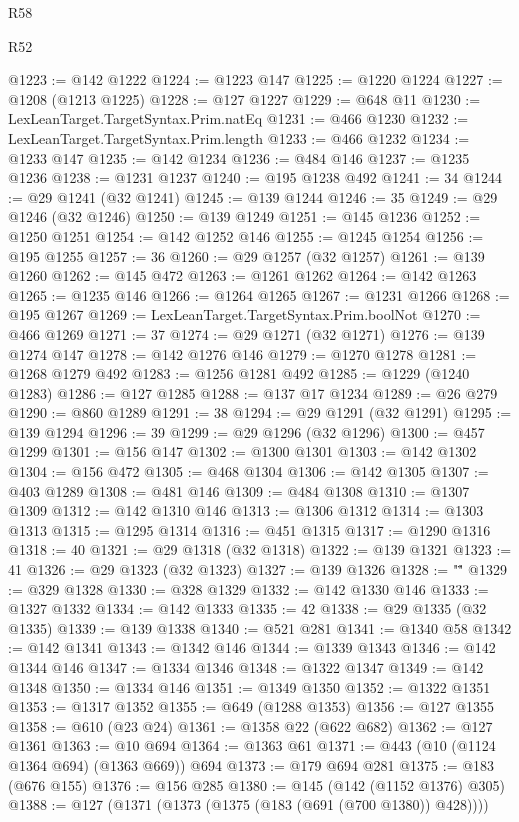 \begin{lexlean}{R58}
\begin{lexlean}{R52}
\begin{coremodule}
{{{{{{{{{{{{{{{{{{{{{{{{{{{{{{{{{{{{{{{{{{{{{{{{{{{{{{{{{{{{{{{{{{{{{{{{{{{{{{{{{{{{{{{{{{{{{{{{{{{{{{{{{{{{{{{{{{{{{{{{{{{{{{{{{{{{{{{{{{{{{{{{{{{{{{{{{{{{{{{{{{{{{{{{{{{{{{{{{{{{{{{{{{{{{{{{{{{{{{@1223 := @142 @1222
@1224 := @1223 @147
@1225 := @1220 @1224
@1227 := @1208 (@1213 @1225)
@1228 := @127 @1227
@1229 := @648 @11
@1230 := LexLeanTarget.TargetSyntax.Prim.natEq
@1231 := @466 @1230
@1232 := LexLeanTarget.TargetSyntax.Prim.length
@1233 := @466 @1232
@1234 := @1233 @147
@1235 := @142 @1234
@1236 := @484 @146
@1237 := @1235 @1236
@1238 := @1231 @1237
@1240 := @195 @1238 @492
@1241 := 34
@1244 := @29 @1241 (@32 @1241)
@1245 := @139 @1244
@1246 := 35
@1249 := @29 @1246 (@32 @1246)
@1250 := @139 @1249
@1251 := @145 @1236
@1252 := @1250 @1251
@1254 := @142 @1252 @146
@1255 := @1245 @1254
@1256 := @195 @1255
@1257 := 36
@1260 := @29 @1257 (@32 @1257)
@1261 := @139 @1260
@1262 := @145 @472
@1263 := @1261 @1262
@1264 := @142 @1263
@1265 := @1235 @146
@1266 := @1264 @1265
@1267 := @1231 @1266
@1268 := @195 @1267
@1269 := LexLeanTarget.TargetSyntax.Prim.boolNot
@1270 := @466 @1269
@1271 := 37
@1274 := @29 @1271 (@32 @1271)
@1276 := @139 @1274 @147
@1278 := @142 @1276 @146
@1279 := @1270 @1278
@1281 := @1268 @1279 @492
@1283 := @1256 @1281 @492
@1285 := @1229 (@1240 @1283)
@1286 := @127 @1285
@1288 := @137 @17 @1234
@1289 := @26 @279
@1290 := @860 @1289
@1291 := 38
@1294 := @29 @1291 (@32 @1291)
@1295 := @139 @1294
@1296 := 39
@1299 := @29 @1296 (@32 @1296)
@1300 := @457 @1299
@1301 := @156 @147
@1302 := @1300 @1301
@1303 := @142 @1302
@1304 := @156 @472
@1305 := @468 @1304
@1306 := @142 @1305
@1307 := @403 @1289
@1308 := @481 @146
@1309 := @484 @1308
@1310 := @1307 @1309
@1312 := @142 @1310 @146
@1313 := @1306 @1312
@1314 := @1303 @1313
@1315 := @1295 @1314
@1316 := @451 @1315
@1317 := @1290 @1316
@1318 := 40
@1321 := @29 @1318 (@32 @1318)
@1322 := @139 @1321
@1323 := 41
@1326 := @29 @1323 (@32 @1323)
@1327 := @139 @1326
@1328 := "\""
@1329 := @329 @1328
@1330 := @328 @1329
@1332 := @142 @1330 @146
@1333 := @1327 @1332
@1334 := @142 @1333
@1335 := 42
@1338 := @29 @1335 (@32 @1335)
@1339 := @139 @1338
@1340 := @521 @281
@1341 := @1340 @58
@1342 := @142 @1341
@1343 := @1342 @146
@1344 := @1339 @1343
@1346 := @142 @1344 @146
@1347 := @1334 @1346
@1348 := @1322 @1347
@1349 := @142 @1348
@1350 := @1334 @146
@1351 := @1349 @1350
@1352 := @1322 @1351
@1353 := @1317 @1352
@1355 := @649 (@1288 @1353)
@1356 := @127 @1355
@1358 := @610 (@23 @24)
@1361 := @1358 @22 (@622 @682)
@1362 := @127 @1361
@1363 := @10 @694
@1364 := @1363 @61
@1371 := @443 (@10 (@1124 @1364 @694) (@1363 @669)) @694
@1373 := @179 @694 @281
@1375 := @183 (@676 @155)
@1376 := @156 @285
@1380 := @145 (@142 (@1152 @1376) @305)
@1388 := @127 (@1371 (@1373 (@1375 (@183 (@691 (@700 @1380)) @428))))
}}}}}}}}}}}}}}}}}}}}}}}}}}}}}}}}}}}}}}}}}}}}}}}}}}}}}}}}}}}}}}}}}}}}}}}}}}}}}}}}}}}}}}}}}}}}}}}}}}}}}}}}}}}}}}}}}}}}}}}}}}}}}}}}}}}}}}}}}}}}}}}}}}}}}}}}}}}}}}}}}}}}}}}}}}}}}}}}}}}}}}}}}}}}}}}}}}}}}}
\end{coremodule}
\end{lexlean}
\end{lexlean}
